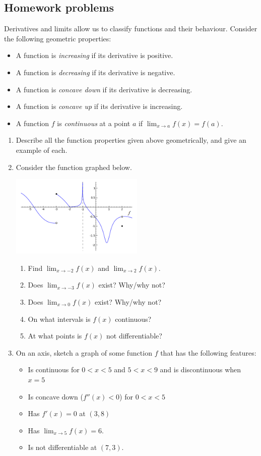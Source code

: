 \subsection{Homework problems}
Derivatives and limits allow us to classify functions and their behaviour. Consider the following geometric properties:
\begin{itemize}
  \item A function is \emph{increasing} if its derivative is positive.
  \item A function is \emph{decreasing} if its derivative is negative.
  \item A function is \emph{concave down} if its derivative is decreasing.
  \item A function is \emph{concave up} if its derivative is increasing.
  \item A function $ f $ is \emph{continuous} at a point $ a $ if $ \lim_{x \to a} f(x) = f(a) $.
\end{itemize}
\begin{enumerate}
  \item Describe all the function properties given above geometrically, and give an example of each.
  \item Consider the function graphed below.
        \begin{center}
          \includegraphics[width=0.5\textwidth]{limits3}
        \end{center}
    \begin{enumerate}
      \item Find $ \lim_{x \to -2} f(x) $ and $ \lim_{x \to 2} f(x) $.
      \item Does $ \lim_{x \to -3} f(x) $ exist? Why/why not?
      \item Does $ \lim_{x \to 0} f(x) $ exist? Why/why not?
      \item On what intervals is $ f(x) $ continuous?
      \item At what points is $ f(x) $ not differentiable?
    \end{enumerate}
  \item On an axis, sketch a graph of some function $ f $ that has the following features:
    \begin{itemize}[noitemsep]
      \item Is continuous for $ 0 < x < 5 $ and $ 5 < x < 9 $ and is discontinuous when $ x = 5 $
      \item Is concave down ($f''(x) < 0 $) for $ 0 < x < 5 $
      \item Has $ f'(x) = 0 $ at $ (3, 8) $
      \item Has $ \lim_{x \to 5} f(x) = 6 $.
      \item Is not differentiable at $ (7, 3) $.
    \end{itemize}
\end{enumerate}
